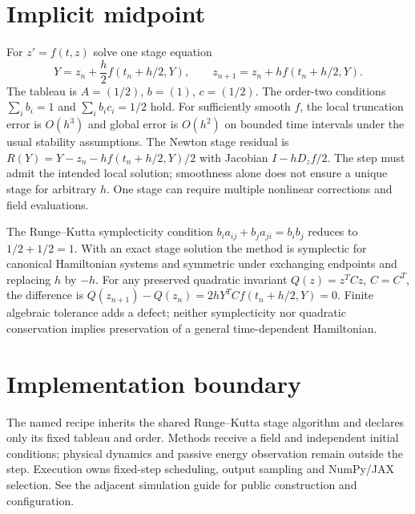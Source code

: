 \documentclass[11pt,a4paper]{article}
\begin{document}
\section*{Implicit midpoint}
For $z'=f(t,z)$ solve one stage equation
\[
Y=z_n+\frac h2 f(t_n+h/2,Y),\qquad z_{n+1}=z_n+h f(t_n+h/2,Y).
\]
The tableau is $A=(1/2)$, $b=(1)$, $c=(1/2)$.
The order-two conditions $\sum_i b_i=1$ and $\sum_i b_ic_i=1/2$ hold.
For sufficiently smooth $f$, the local truncation error is $O(h^3)$ and global error is $O(h^2)$ on bounded time intervals under the usual stability assumptions.
The Newton stage residual is $R(Y)=Y-z_n-hf(t_n+h/2,Y)/2$ with Jacobian $I-hD_zf/2$.
The step must admit the intended local solution; smoothness alone does not ensure a unique stage for arbitrary $h$.
One stage can require multiple nonlinear corrections and field evaluations.

The Runge--Kutta symplecticity condition $b_i a_{ij}+b_j a_{ji}=b_i b_j$ reduces to $1/2+1/2=1$.
With an exact stage solution the method is symplectic for canonical Hamiltonian systems and symmetric under exchanging endpoints and replacing $h$ by $-h$.
For any preserved quadratic invariant $Q(z)=z^TCz$, $C=C^T$, the difference is
$Q(z_{n+1})-Q(z_n)=2hY^TCf(t_n+h/2,Y)=0$.
Finite algebraic tolerance adds a defect; neither symplecticity nor quadratic conservation implies preservation of a general time-dependent Hamiltonian.

\section*{Implementation boundary}
The named recipe inherits the shared Runge--Kutta stage algorithm and declares only its fixed tableau and order.
Methods receive a field and independent initial conditions; physical dynamics and passive energy observation remain outside the step.
Execution owns fixed-step scheduling, output sampling and NumPy/JAX selection.
See the adjacent simulation guide for public construction and configuration.
\end{document}
